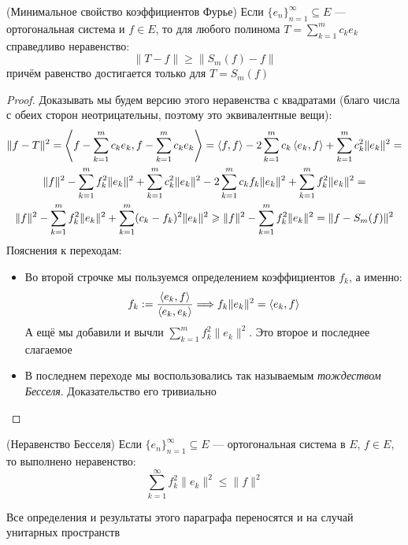\begin{theorem} (Минимальное свойство коэффициентов Фурье)
	Если $\{e_n\}_{n = 1}^\infty \subseteq E$ --- ортогональная система и $f \in E$, то для любого полинома $T = \sum_{k = 1}^m c_ke_k$ справедливо неравенство:
	\[
		\|T - f\| \ge \|S_m(f) - f\|
	\]
	причём равенство достигается только для $T = S_m(f)$
\end{theorem}

\begin{proof}
	Доказывать мы будем версию этого неравенства с квадратами (благо числа с обеих сторон неотрицательны, поэтому это эквивалентные вещи):
	\begin{multline*}
		\|f - T\|^2 = \left\langle f - \sum_{k = 1}^m c_ke_k, f - \sum_{k = 1}^m c_ke_k\right\rangle = \left\langle f, f\right\rangle - 2\sum_{k = 1}^m c_k \left\langle e_k, f\right\rangle + \sum_{k = 1}^m c_k^2 \|e_k\|^2 =
		\\
		\|f\|^2 - \sum_{k = 1}^m f_k^2\|e_k\|^2 + \sum_{k = 1}^m c_k^2\|e_k\|^2 - 2\sum_{k = 1}^m c_kf_k\|e_k\|^2 + \sum_{k = 1}^m f_k^2\|e_k\|^2 =
		\\
		\|f\|^2 - \sum_{k = 1}^m f_k^2\|e_k\|^2 + \sum_{k = 1}^m (c_k - f_k)^2\|e_k\|^2 \geqslant \|f\|^2 - \sum_{k = 1}^m f_k^2\|e_k\|^2 = \|f - S_m(f)\|^2
	\end{multline*}
	Пояснения к переходам:
	\begin{itemize}
		\item Во второй строчке мы пользуемся определением коэффициентов $f_k$, а именно:
		\[
			f_k := \frac{\left\langle e_k, f\right\rangle}{\left\langle e_k, e_k\right\rangle} \Longrightarrow f_k\|e_k\|^2 = \left\langle e_k, f\right\rangle
		\]
		А ещё мы добавили и вычли $\sum_{k = 1}^m f_k^2\|e_k\|^2$. Это второе и последнее слагаемое
		
		\item В последнем переходе мы воспользовались так называемым \textit{тождеством Бесселя}. Доказательство его тривиально
	\end{itemize}
\end{proof}

\begin{corollary} (Неравенство Бесселя)
	Если $\{e_n\}_{n = 1}^\infty \subseteq E$ --- ортогональная система в $E$, $f \in E$, то выполнено неравенство:
	\[
		\sum_{k = 1}^\infty f_k^2\|e_k\|^2 \le \|f\|^2
	\]
\end{corollary}

\begin{note}
	Все определения и результаты этого параграфа переносятся и на случай унитарных пространств
\end{note}

